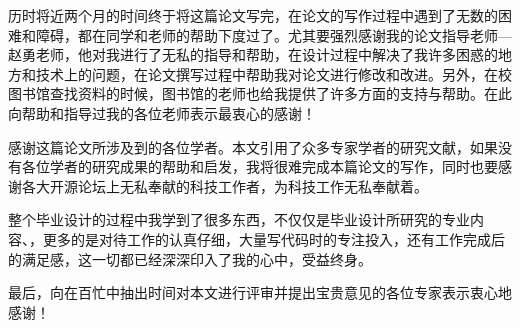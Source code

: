 
历时将近两个月的时间终于将这篇论文写完，在论文的写作过程中遇到了无数的困难和障碍，都在同学和老师的帮助下度过了。尤其要强烈感谢我的论文指导老师—赵勇老师，他对我进行了无私的指导和帮助，在设计过程中解决了我许多困惑的地方和技术上的问题，在论文撰写过程中帮助我对论文进行修改和改进。另外，在校图书馆查找资料的时候，图书馆的老师也给我提供了许多方面的支持与帮助。在此向帮助和指导过我的各位老师表示最衷心的感谢！

感谢这篇论文所涉及到的各位学者。本文引用了众多专家学者的研究文献，如果没有各位学者的研究成果的帮助和启发，我将很难完成本篇论文的写作，同时也要感谢各大开源论坛上无私奉献的科技工作者，为科技工作无私奉献着。

整个毕业设计的过程中我学到了很多东西，不仅仅是毕业设计所研究的专业内容、，更多的是对待工作的认真仔细，大量写代码时的专注投入，还有工作完成后的满足感，这一切都已经深深印入了我的心中，受益终身。

最后，向在百忙中抽出时间对本文进行评审并提出宝贵意见的各位专家表示衷心地感谢！ 